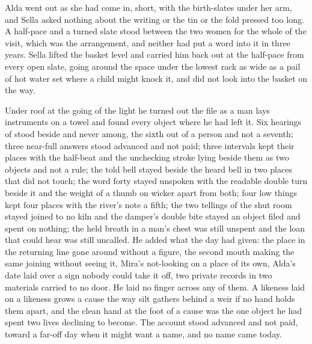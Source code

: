 Alda went out as she had come in, short, with the birth-slates under her arm, and Sella asked nothing about the writing or the tin or the fold pressed too long. A half-pace and a turned slate stood between the two women for the whole of the visit, which was the arrangement, and neither had put a word into it in three years. Sella lifted the basket level and carried him back out at the half-pace from every open slate, going around the space under the lowest rack as wide as a pail of hot water set where a child might knock it, and did not look into the basket on the way.

\scenebreak

Under  roof at the going of the light he turned out the file as a man lays instruments on a towel and found every object where he had left it. Six hearings of  stood beside and never among, the sixth out of a person and not a seventh; three near-full answers stood advanced and not paid; three intervals kept their places with the half-beat and the unchecking stroke lying beside them as two objects and not a rule; the told bell stayed beside the heard bell in two places that did not touch; the word forty stayed unspoken with the readable double turn beside it and the weight of a thumb on wicker apart from both; four low things kept four places with the river's note a fifth; the two tellings of the shut room stayed joined to no kiln and the damper's double bite stayed an object filed and spent on nothing; the held breath in a man's chest was still unspent and the loan that could hear was still uncalled. He added what the day had given: the place in the returning line gone around without a figure, the second mouth making the same joining without seeing it, Mira's not-looking on a place of its own, Alda's date laid over a sign nobody could take it off, two private records in two materials carried to no door. He laid no finger across any of them. A likeness laid on a likeness grows a cause the way silt gathers behind a weir if no hand holds them apart, and the clean hand at the foot of a cause was the one object he had spent two lives declining to become. The account stood advanced and not paid, toward a far-off day when it might want a name, and no name came today.


